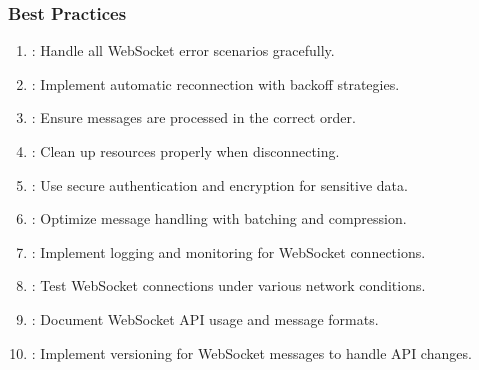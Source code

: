 \documentclass[letterpaper,10pt,english]{sphinxmanual}
\begin{document}
\subsubsection{Best Practices}
\label{\detokenize{api/websocket-api:best-practices}}\begin{enumerate}
%
\item {} 
\sphinxAtStartPar
{}: Handle all WebSocket error scenarios gracefully.

\item {} 
\sphinxAtStartPar
{}: Implement automatic reconnection with backoff strategies.

\item {} 
\sphinxAtStartPar
{}: Ensure messages are processed in the correct order.

\item {} 
\sphinxAtStartPar
{}: Clean up resources properly when disconnecting.

\item {} 
\sphinxAtStartPar
{}: Use secure authentication and encryption for sensitive data.

\item {} 
\sphinxAtStartPar
{}: Optimize message handling with batching and compression.

\item {} 
\sphinxAtStartPar
{}: Implement logging and monitoring for WebSocket connections.

\item {} 
\sphinxAtStartPar
{}: Test WebSocket connections under various network conditions.

\item {} 
\sphinxAtStartPar
{}: Document WebSocket API usage and message formats.

\item {} 
\sphinxAtStartPar
{}: Implement versioning for WebSocket messages to handle API changes.

\end{enumerate}
\end{document}
